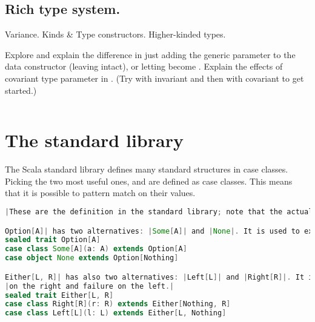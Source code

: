 \documentclass[10 pt]{article}
\begin{document}
\subsection{Rich type system.}
Variance. Kinds \& Type constructors. Higher-kinded types.

\begin{example}
Explore and explain the difference in just adding the generic parameter to the  data constructor (leaving  intact), or letting  become . Explain the effects of covariant type parameter in . (Try  with invariant  and then with covariant  to get started.)

\begin{lstlisting}[caption={Variance}, label={code:variance}, language=Scala, escapechar=|]


\end{lstlisting}
\end{example}


\section{The standard library}
The Scala standard library defines many standard structures in case classes. Picking the two most useful ones,  and  are defined as case classes. This means that it is possible to pattern match on their values.

\begin{lstlisting}[caption={Pattern matching in stdlib}, label={code:pm4}, language=Scala, escapechar=|]
|These are the definition in the standard library; note that the actual definitions are more complex, but this code expresses the essence.|

Option[A]| has two alternatives: |Some[A]| and |None|. It is used to express one-or-missing values.|
sealed trait Option[A]
case class Some[A](a: A) extends Option[A]
case object None extends Option[Nothing]

Either[L, R]| has also two alternatives: |Left[L]| and |Right[R]|. It is used to express success or failure, with success by convention|
|on the right and failure on the left.|
sealed trait Either[L, R]
case class Right[R](r: R) extends Either[Nothing, R]
case class Left[L](l: L) extends Either[L, Nothing]
\end{lstlisting}
\end{document}
